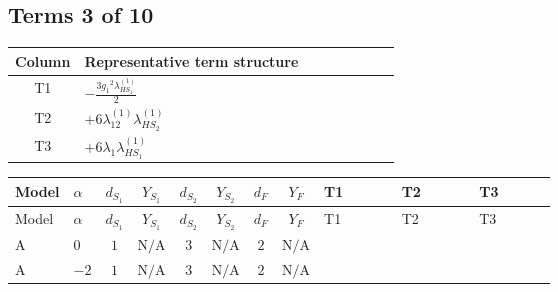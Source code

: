 \documentclass[8pt]{article}
\begin{document}
\begin{landscape}
\subsection*{Terms 3 of 10}
\begin{center}
\begin{tabular}{@{}c >{\raggedright\arraybackslash}p{0.82\linewidth}@{}}
\toprule
Column & Representative term structure \\
\midrule
T1 & \(\displaystyle -\frac{3 {g_1}^2 {\lambda_{HS_1}^{(1)}}}{2}\) \\
\midrule
T2 & \(\displaystyle +6 {\lambda_{12}^{(1)}} {\lambda_{HS_2}^{(1)}}\) \\
\midrule
T3 & \(\displaystyle +6 {\lambda_1} {\lambda_{HS_1}^{(1)}}\) \\
\midrule
\bottomrule
\end{tabular}
\end{center}
\smallskip
\tiny
\begin{longtable}{@{}llcccccc >{\raggedright\arraybackslash}p{0.21\linewidth} >{\raggedright\arraybackslash}p{0.21\linewidth} >{\raggedright\arraybackslash}p{0.21\linewidth}@{}}
\toprule
Model & $\alpha$ & $d_{S_1}$ & $Y_{S_1}$ & $d_{S_2}$ & $Y_{S_2}$ & $d_F$ & $Y_F$ & T1 & T2 & T3 \\
\midrule
\endfirsthead
\toprule
Model & $\alpha$ & $d_{S_1}$ & $Y_{S_1}$ & $d_{S_2}$ & $Y_{S_2}$ & $d_F$ & $Y_F$ & T1 & T2 & T3 \\
\midrule
\endhead
A & $0$ & $1$ & $\text{N/A}$ & $3$ & $\text{N/A}$ & $2$ & $\text{N/A}$ & \scriptsize\adjustbox{max width=\linewidth}{$\begin{gathered} -\frac{3 {g_1}^2 {\lambda_{HS_1}^{(1)}}}{2}\end{gathered}$} & \scriptsize\adjustbox{max width=\linewidth}{$\begin{gathered} +6 {\lambda_{12}^{(1)}} {\lambda_{HS_2}^{(1)}}\end{gathered}$} & \scriptsize\adjustbox{max width=\linewidth}{$\begin{gathered} +6 {\lambda_1} {\lambda_{HS_1}^{(1)}}\end{gathered}$} \\
\midrule
A & $-2$ & $1$ & $\text{N/A}$ & $3$ & $\text{N/A}$ & $2$ & $\text{N/A}$ & \scriptsize\adjustbox{max width=\linewidth}{$\begin{gathered} -\frac{15 {g_1}^2 {\lambda_{HS_1}^{(1)}}}{2}\end{gathered}$} & \scriptsize\adjustbox{max width=\linewidth}{$\begin{gathered} +6 {\lambda_{12}^{(1)}} {\lambda_{HS_2}^{(1)}}\end{gathered}$} & \scriptsize\adjustbox{max width=\linewidth}{$\begin{gathered} +6 {\lambda_1} {\lambda_{HS_1}^{(1)}}\end{gathered}$} \\

\end{longtable}
\end{landscape}
\end{document}
